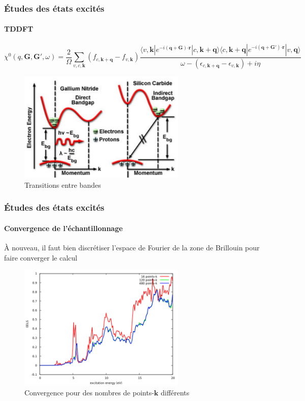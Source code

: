 \documentclass[french]{beamer}
\newcommand{\vb}[1]{\mathbf{#1}}
\newcommand{\bra}[1]{\langle#1 |}
\newcommand{\ket}[1]{| #1 \rangle}
\newcommand{\vdot}[0]{\boldsymbol\cdot}
\begin{document}
\begin{frame}[shrink=20]
\frametitle{Études des états excités}
\framesubtitle{TDDFT}
\begin{equation*}
  \chi^0(q, \vb{G}, \vb{G}', \omega) = \frac{2}{\Omega}\sum_{v,c,\vb{k}}(f_{c,\vb{k}+\vb{q}} - f_{v,\vb{k}}) \frac{\bra{v, \vb{k}}e^{-i(\vb{q}+\vb{G})\vdot\vb{r}} \ket{c , \vb{k}+\vb{q}}\bra{c, \vb{k}+\vb{q}} e^{-i(\vb{q}+\vb{G}')\vdot\vb{r}} \ket{v , \vb{q}}}{\omega - (\epsilon_{c, \vb{k}+\vb{q}} - \epsilon_{v,\vb{k}}) + i\eta}
\end{equation*}
\begin{figure}[!h]
    \centering
    \includegraphics[width=8cm]{transition}
    \caption{Transitions entre bandes}
\end{figure}
\end{frame}
\newpage
\begin{frame}
\frametitle{Études des états excités}
\framesubtitle{Convergence de l'échantillonnage}
À nouveau, il faut bien discrétiser l'espace de Fourier de la zone de Brillouin pour faire converger le calcul
\begin{figure}[!h]
    \centering
    \includegraphics[width=8cm]{kpt_compare}
    \caption{Convergence pour des nombres de points-$\vb{k}$ différents}
\end{figure}

\end{frame}
\end{document}
